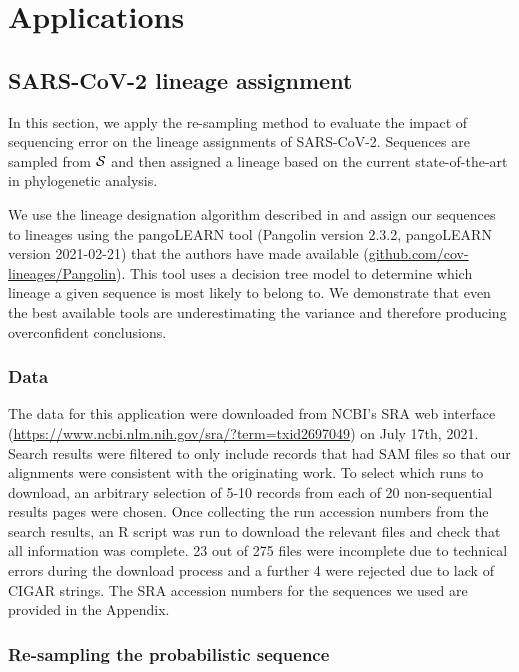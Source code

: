 \documentclass[10pt]{article}
\begin{document}
\section{Applications}

\subsection{SARS-CoV-2 lineage assignment}

In this section, we apply the re-sampling method to evaluate the impact of sequencing error on the lineage assignments of SARS-CoV-2.
Sequences are sampled from $\mathcal{S}$ and then assigned a lineage based on the current state-of-the-art in phylogenetic analysis.

We use the lineage designation algorithm described in \citet{rambautDynamicNomenclatureProposal2020} and assign our sequences to lineages using the pangoLEARN tool (Pangolin version 2.3.2, pangoLEARN version 2021-02-21) that the authors have made available (\url{github.com/cov-lineages/Pangolin}).
This tool uses a decision tree model to determine which lineage a given sequence is most likely to belong to.
We demonstrate that even the best available tools are underestimating the variance and therefore producing overconfident conclusions.

\subsubsection{Data}

The data for this application were downloaded from NCBI's SRA web interface (\url{https://www.ncbi.nlm.nih.gov/sra/?term=txid2697049}) on July 17th, 2021.
Search results were filtered to only include records that had SAM files so that our alignments were consistent with the originating work.
To select which runs to download, an arbitrary selection of 5-10 records from each of 20 non-sequential results pages were chosen.
Once collecting the run accession numbers from the search results, an R script was run to download the relevant files and check that all information was complete.
23 out of 275 files were incomplete due to technical errors during the download process and a further 4 were rejected due to lack of CIGAR strings. 
The SRA accession numbers for the sequences we used are provided in the Appendix. 


\subsubsection{Re-sampling the probabilistic sequence}\label{sec:Res1}
\end{document}
